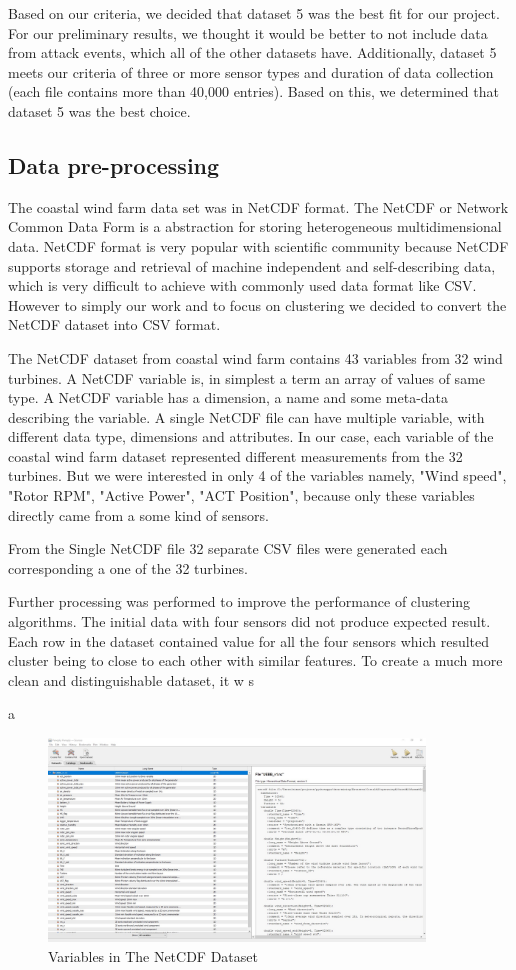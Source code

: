 \documentclass[letterpaper, 10 pt, conference]{ieeeconf}  %
\begin{document}
Based on our criteria, we decided that dataset 5 was the best fit for our project. For our preliminary results, we thought it would be better to not include data from attack events, which all of the other datasets have. Additionally, dataset 5 meets our criteria of three or more sensor types and duration of data collection (each file contains more than 40,000 entries). Based on this, we determined that dataset 5 was the best choice.

\subsection{Data pre-processing}
The coastal wind farm data set was in NetCDF format. The NetCDF or Network Common Data Form is a abstraction for storing heterogeneous multidimensional data. NetCDF format is very popular with scientific community because NetCDF supports storage and retrieval of machine independent and self-describing data, which is very difficult to achieve with commonly used data format like CSV. However to simply our work and to focus on clustering we decided to convert the NetCDF dataset into CSV format.

The NetCDF dataset from coastal wind farm contains 43 variables from 32 wind turbines. A NetCDF variable is, in simplest a term an array of values of same type. A NetCDF variable has a dimension, a name and some meta-data describing the variable. A single NetCDF file can have multiple variable, with different data type, dimensions and attributes. In our case, each variable of the coastal wind farm dataset represented different measurements from the 32 turbines. But we were interested in only 4 of the variables namely, "Wind speed", "Rotor RPM", "Active Power", "ACT Position", because only these variables directly came from a some kind of sensors.

From the Single NetCDF file 32 separate CSV files were generated each corresponding a one of the 32 turbines.

Further processing was performed to improve the performance of clustering algorithms. The initial data with four sensors did not produce expected result. Each row in the dataset contained value for all the four sensors which resulted cluster being to close to each other with similar features. To create a much more clean and distinguishable dataset, it w s

a\begin{figure}[htb]
    \centering
    \includegraphics[width=10cm]{nc.jpg}
    \caption{Variables in The NetCDF Dataset}
\end{figure}
\end{document}
